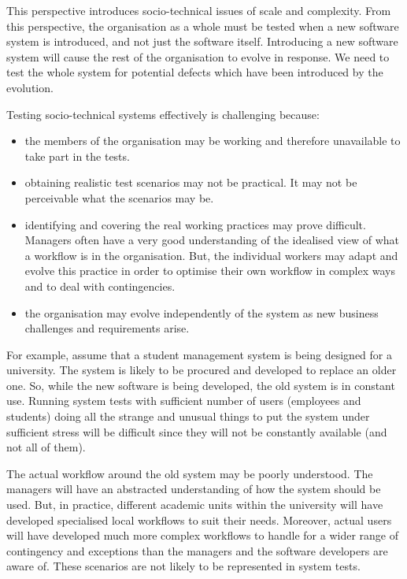 \documentclass[a4paper, openany]{memoir}
\begin{document}
This perspective introduces socio-technical issues of scale and complexity. From this perspective, the organisation as a whole must be tested when a new software system is introduced, and not just the software itself. Introducing a new software system will cause the rest of the organisation to evolve in response. We need to test the whole system for potential defects which have been introduced by the evolution.

Testing socio-technical systems effectively is challenging because:
\begin{itemize}
    \item the members of the organisation may be working and therefore unavailable to take part in the tests.
    \item obtaining realistic test scenarios may not be practical. It may not be perceivable what the scenarios may be.
    \item identifying and covering the real working practices may prove difficult. Managers often have a very good understanding of the idealised view of what a workflow is in the organisation. But, the individual workers may adapt and evolve this practice in order to optimise their own workflow in complex ways and to deal with contingencies.
    \item the organisation may evolve independently of the system as new business challenges and requirements arise.
\end{itemize}

For example, assume that a student management system is being designed for a university. The system is likely to be procured and developed to replace an older one. So, while the new software is being developed, the old system is in constant use. Running system tests with sufficient number of users (employees and students) doing all the strange and unusual things to put the system under sufficient stress will be difficult since they will not be constantly available (and not all of them). 

The actual workflow around the old system may be poorly understood. The managers will have an abstracted understanding of how the system should be used. But, in practice, different academic units within the university will have developed specialised local workflows to suit their needs. Moreover, actual users will have developed much more complex workflows to handle for a wider range of contingency and exceptions than the managers and the software developers are aware of. These scenarios are not likely to be represented in system tests.
\end{document}
